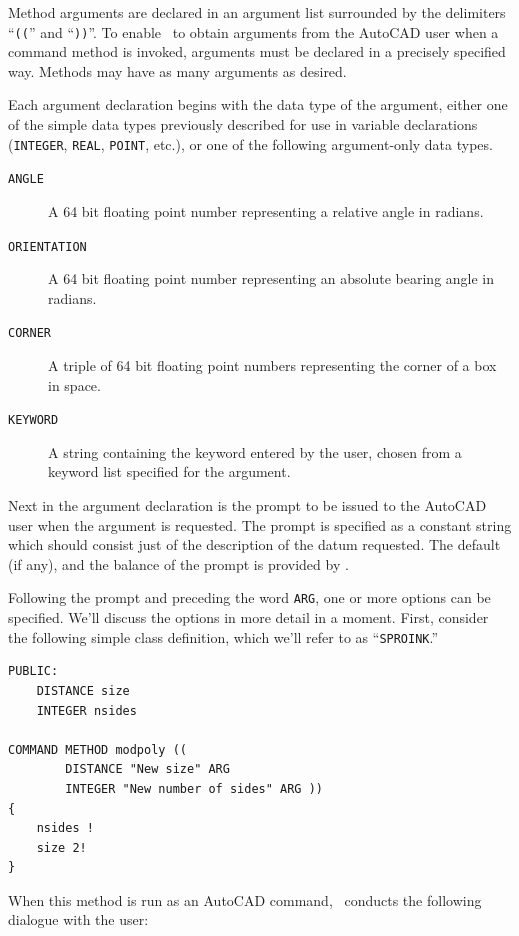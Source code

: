 \documentclass{article}
\begin{document}
Method arguments are declared in an argument list surrounded by the
delimiters ``{\tt ((}'' and ``{\tt ))}''.  To enable \cw\ to
obtain arguments from the AutoCAD user when a command
method is invoked, arguments must be declared in a precisely specified
way.  Methods may have as many arguments as desired.

Each argument declaration begins with the data type of the argument,
either one of the simple data types previously described for use in
variable declarations ({\tt INTEGER}, {\tt REAL}, {\tt POINT}, etc.),
or one of the following argument-only data types.

\begin{description}
\item[{\tt ANGLE}]      A 64 bit floating point number representing
                        a relative angle in radians.
\item[{\tt ORIENTATION}]    A 64 bit floating point number representing
                        an absolute bearing angle in radians.
\item[{\tt CORNER}]     A triple of 64 bit floating point numbers
                        representing the corner of a box in space.
\item[{\tt KEYWORD}]    A string containing the keyword entered by
                        the user, chosen from a keyword list specified
                        for the argument.
\end{description}

Next in the argument declaration is the prompt to be issued to the
AutoCAD user when the argument is requested.  The prompt is specified
as a constant string which should consist just of the description of
the datum requested.  The default (if any), and the balance of the
prompt is provided by \cw .

Following the prompt and preceding the word {\tt ARG}, one or more
options can be specified.  We'll discuss the options in more detail in
a moment.  First, consider the following simple class definition,
which we'll refer to as ``{\tt SPROINK}.''

\begin{verbatim}
PUBLIC:
    DISTANCE size
    INTEGER nsides

COMMAND METHOD modpoly ((
        DISTANCE "New size" ARG
        INTEGER "New number of sides" ARG ))
{
    nsides !
    size 2!
}
\end{verbatim}

When this method is run as an AutoCAD command, \cw\ conducts the
following dialogue with the user:
\end{document}

